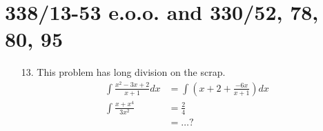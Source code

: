 \message{ !name(mathHW150212.tex)}\documentclass[11pt]{article}
\begin{document}

\section{338/13-53 e.o.o. and 330/52, 78, 80, 95}
\begin{itemize}
\item [13. ] This problem has long division on the scrap.
\begin{align*}
	\int \frac{x^2-3x+2}{x+1}dx &= \int \left( x+2+\frac{-6x}{x+1}\right)dx \\
	\int \frac{x+x^4}{3x^2} &= \frac{2}{4}\\
	&= \ldots ?
\end{align*}
\end{itemize}
\end{document}
